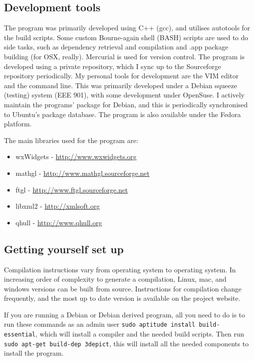 \documentclass[10pt]{article}
\begin{document}
\subsection{Development tools}
The program was primarily developed using C++ (gcc), and utilises autotools for the build scripts. Some custom Bourne-again shell (BASH) scripts are used to do side tasks, such as dependency retrieval and compilation and .app package building (for OSX, really). Mercurial is used for version control. The program is developed using a private repository, which I sync up to the Sourceforge repository periodically. My personal tools for development are the VIM editor and the command line.  This was primarily developed under a Debian squeeze (testing) system (EEE 901), with some development under OpenSuse. I actively maintain the programs' package for Debian, and this is periodically synchronised to Ubuntu's package database. The program is also available under the Fedora platform.
 
The main libraries used for the program are:

\begin{itemize}
\item wxWidgets - \url{http://www.wxwidgets.org}
\item mathgl - \url{http://www.mathgl.sourceforge.net}
\item ftgl -  \url{http://www.ftgl.sourceforge.net}
\item libxml2 -  \url{http://xmlsoft.org}
\item qhull -  \url{http://www.qhull.org}
\end{itemize}

\subsection{Getting yourself set up}
Compilation instructions vary from operating system to operating system. In increasing order of complexity to generate a compilation, Linux, mac, and windows versions can be built from source. Instructions for compilation change frequently, and the most up to date version is available on the project website.

If you are running a Debian or Debian derived program, all you need to do is to run these commands as an admin user \texttt{sudo aptitude install build-essential}, which will install a compiler and the needed build scripts. Then run \texttt{sudo apt-get build-dep 3depict}, this will install all the needed components to install the program.
\end{document}
